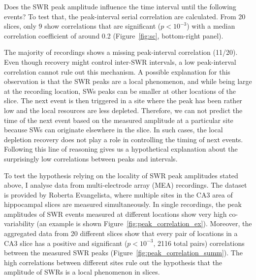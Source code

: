 
    Does the SWR peak amplitude influence the time interval until the following
    events? To test that, the peak-interval serial correlation are calculated.
    From 20 slices, only 9 show correlations that are significant
    ($p<10^{-3}$) with a median correlation coefficient of around 0.2
    (Figure~\ref{fig:sc}, bottom-right panel).
    
    The majority of recordings shows a missing peak-interval correlation
    (11/20). Even though recovery might control inter-SWR intervals, a low
    peak-interval correlation cannot rule out this mechanism. A possible
    explanation for this observation is that the SWR peaks are a local
    phenomenon, and while being large at the recording location, SWs peaks can
    be smaller at other locations of the slice. The next event is then
    triggered in a site where the peak has been rather low and the local
    resources are less depleted. Therefore, we can not predict the time of the
    next event based on the measured amplitude at a particular site because SWs
    can originate elsewhere in the slice. In such cases, the local depletion
    recovery does not play a role in controlling the timing of next events.
    Following this line of reasoning gives us a hypothetical explanation about
    the surprisingly low correlations between peaks and intervals.

    To test the hypothesis relying on the locality of SWR peak amplitudes
    stated above, I analyse data from multi-electrode array (MEA) recordings.
    The dataset is provided by Roberta Evangelista, where multiple sites in the
    CA3 area of hippocampal slices are measured simultaneously. In single
    recordings, the peak amplitudes of SWR events measured at different
    locations show very high co-variability (an example is shown
    Figure~\ref{fig:peak_correlation_ex}). Moreover, the aggregated data from
    20 different slices show that every pair of locations in a CA3 slice has a
    positive and significant ($p<10^{-3}$, 2116 total pairs) correlations between
    the measured SWR peaks (Figure~\ref{fig:peak_correlation_summ}). The high
    correlations between different sites rule out the hypothesis that the
    amplitude of SWRs is a local phenomenon in slices.

